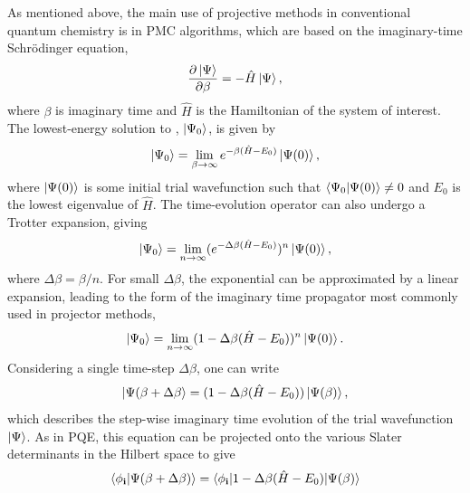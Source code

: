 \documentclass[%
 reprint,
 amsmath,amssymb,
 aps,
]{revtex4-2}
\begin{document}
As mentioned above, the main use of projective methods in conventional quantum chemistry is in PMC algorithms, which are based on the imaginary-time Schr\"odinger equation,
\begin{equation}
    \frac{\partial \ket{\Psi}}{\partial \beta} = - \hat H \ket{\Psi},
    \label{eq:im_sch}
\end{equation}
where $\beta$ is imaginary time and $\hat H$ is the Hamiltonian of the system of interest. The lowest-energy solution to , $\ket{\Psi_0}$, is given by
\begin{equation}
    \ket{\Psi_0} = \lim_{\beta \rightarrow \infty} e^{-\beta (\hat H - E_0)}\ket{\Psi(0)},
\end{equation}
where $\ket{\Psi(0)}$ is some initial trial wavefunction such that $\braket{\Psi_0|\Psi(0)}\neq0$ and $E_0$ is the lowest eigenvalue of $\hat H$. The time-evolution operator can also undergo a Trotter expansion, giving
\begin{equation}
    \ket{\Psi_0} = \lim_{n \rightarrow \infty} (e^{-\Delta \beta (\hat H - E_0)})^n \ket{\Psi(0)},
\end{equation}
where $\Delta \beta = \beta/n$. For small $\Delta \beta$, the exponential can be approximated by a linear expansion, leading to the form of the imaginary time propagator most commonly used in projector methods,
\begin{equation}
    \ket{\Psi_0} = \lim_{n \rightarrow \infty} (1 - \Delta\beta (\hat H - E_0))^n \ket{\Psi(0)}.
    \label{eq:proj}
\end{equation}
Considering a single time-step $\Delta \beta$, one can write
\begin{equation}
        \ket{\Psi(\beta + \Delta \beta} = (1 - \Delta\beta (\hat H - E_0)) \ket{\Psi(\beta)},
\end{equation}
which describes the step-wise imaginary time evolution of the trial wavefunction $\ket{\Psi}$. As in PQE, this equation can be projected onto the various Slater determinants in the Hilbert space to give
\begin{equation}
    \braket{\phi_\mathbf{i}|\Psi(\beta + \Delta \beta)} = \braket{\phi_\mathbf{i}|1 - \Delta\beta (\hat H - E_0)|\Psi(\beta)}
    \label{eq:pmc}
\end{equation}
\end{document}
